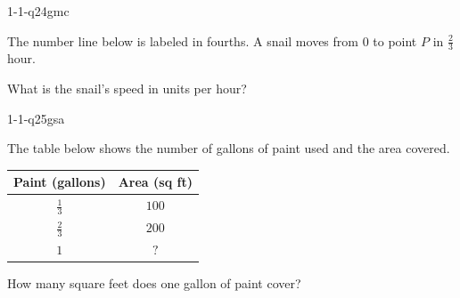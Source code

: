 \begin{practiceQuestion}{1-1-q24}{gmc}
\begin{questionText}
The number line below is labeled in fourths. A snail moves from $0$ to point $P$ in $\frac{2}{3}$ hour.

\begin{center}
\end{center}

What is the snail's speed in units per hour?
\end{questionText}
\end{practiceQuestion}


\begin{practiceQuestion}{1-1-q25}{gsa}
\begin{questionText}
The table below shows the number of gallons of paint used and the area covered.

\begin{center}
\begin{tabular}{|c|c|}
\hline
\textbf{Paint (gallons)} & \textbf{Area (sq ft)} \\
\hline
$\frac{1}{3}$ & $100$ \\[4pt]
$\frac{2}{3}$ & $200$ \\[4pt]
$1$ & $?$ \\
\hline
\end{tabular}
\end{center}

How many square feet does one gallon of paint cover?
\end{questionText}
\end{practiceQuestion}

